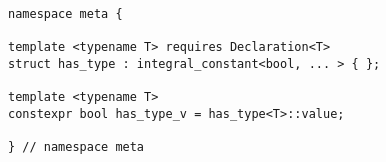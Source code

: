 
\begin{verbatim}
namespace meta {

template <typename T> requires Declaration<T>
struct has_type : integral_constant<bool, ... > { };

template <typename T>
constexpr bool has_type_v = has_type<T>::value;

} // namespace meta
\end{verbatim}
